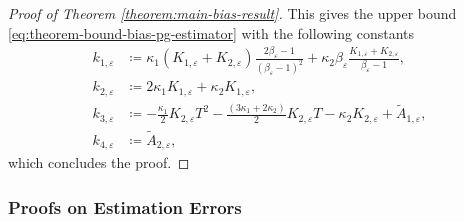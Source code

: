 \documentclass[11pt]{article}
\numberwithin{equation}{section}
\theoremstyle{definition}
\theoremstyle{remark}
\def\eps{\varepsilon}
\begin{document}
\begin{proof}[Proof of Theorem \ref{theorem:main-bias-result}]
This gives the upper bound \eqref{eq:theorem-bound-bias-pg-estimator} with the following constants
\begin{equation}
    \label{eq:constant-bias-pg-expression}
\begin{aligned}
    k_{1, \eps} & \coloneq \kappa_1 (K_{1, \eps} + K_{2, \eps}) \frac{2 \beta_\eps - 1}{(\beta_\eps - 1)^2} + \kappa_2 \beta_\eps\frac{K_{1, \eps} + K_{2, \eps}}{\beta_\eps - 1}, \\
    k_{2, \eps} & \coloneq 2 \kappa_1 K_{1, \eps} + \kappa_2 K_{1, \eps}, \\
    k_{3, \eps} & \coloneq - \frac{\kappa_1 }{2} K_{2,\eps} T^2 - \frac{(3 \kappa_1 + 2 \kappa_2)}{2} K_{2, \eps} T - \kappa_2 K_{2, \eps} + \tilde A_{1, \eps}, \\
    k_{4, \eps} & \coloneq \tilde A_{2, \eps},
\end{aligned}
\end{equation}
which concludes the proof.
\end{proof}

\subsubsection{Proofs on Estimation Errors}
\end{document}
